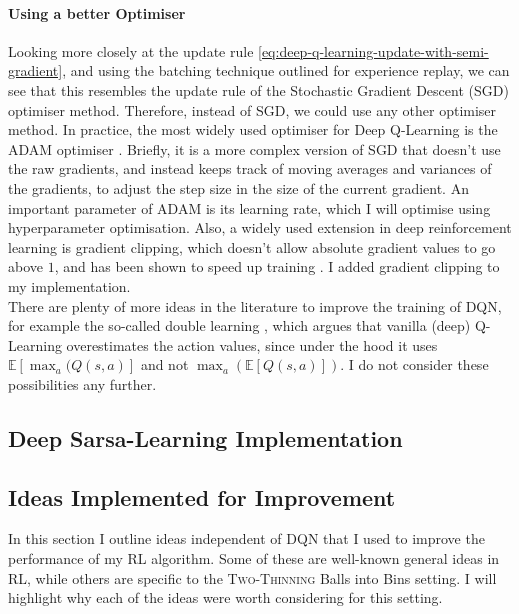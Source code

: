 \paragraph{Using a better Optimiser}


Looking more closely at the update rule \ref{eq:deep-q-learning-update-with-semi-gradient}, and using the batching technique outlined for experience replay, we can see that this resembles the update rule of the Stochastic Gradient Descent (SGD) optimiser method. Therefore, instead of SGD, we could use any other optimiser method. In practice, the most widely used optimiser for Deep Q-Learning is the ADAM optimiser \cite{kingma2015adamoptimiser}. Briefly, it is a more complex version of SGD that doesn't use the raw gradients, and instead keeps track of moving averages and variances of the gradients, to adjust the step size in the size of the current gradient. An important parameter of ADAM is its learning rate, which I will optimise using hyperparameter optimisation. Also, a widely used extension in deep reinforcement learning is gradient clipping, which doesn't allow absolute gradient values to go above $1$, and has been shown to speed up training \cite{zhang2020gradientclipping}. I added gradient clipping to my implementation.\\



There are plenty of more ideas in the literature to improve the training of DQN, for example the so-called double learning \cite{hasselt2010doubleqlearning}, which argues that vanilla (deep) Q-Learning overestimates the action values, since under the hood it uses $\mathbb{E}[\max_a(Q(s,a)]$ and not $\max_a(\mathbb{E}[Q(s,a)])$. I do not consider these possibilities any further.


\subsection{Deep Sarsa-Learning Implementation}




\subsection{Ideas Implemented for Improvement} \label{improvementideas}


In this section I outline ideas independent of DQN that I used to improve the performance of my RL algorithm. Some of these are well-known general ideas in RL, while others are specific to the \textsc{Two-Thinning} Balls into Bins setting. I will highlight why each of the ideas were worth considering for this setting.


